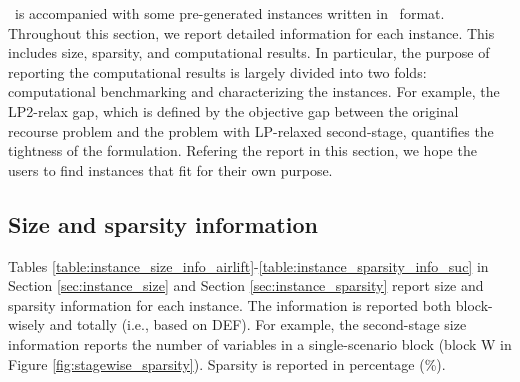 %
%

\siplibtwo\ is accompanied with some pre-generated instances written in \smps\ format. Throughout this section, we report detailed information for each instance. This includes size, sparsity, and computational results. In particular, the purpose of reporting the computational results is largely divided into two folds: computational benchmarking and characterizing the instances. For example, the LP2-relax gap, which is defined by the objective gap between the original recourse problem and the problem with LP-relaxed second-stage, quantifies the tightness of the formulation. Refering the report in this section, we hope the users to find instances that fit for their own purpose.


\subsection{Size and sparsity information}
Tables \ref{table:instance_size_info_airlift}-\ref{table:instance_sparsity_info_suc} in Section \ref{sec:instance_size} and Section \ref{sec:instance_sparsity} report size and sparsity information for each instance. The information is reported both block-wisely and totally (i.e., based on DEF). For example, the second-stage size information reports the number of variables in a single-scenario block (block W in Figure \ref{fig:stagewise_sparsity}). Sparsity is reported in percentage (\%). 

